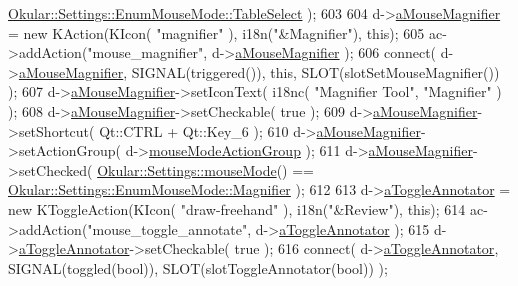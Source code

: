 \begin{DoxyCode}
      \hyperlink{classOkular_1_1Settings_1_1EnumMouseMode_ab2ae04e2d7d069f02195ccf32c52415ba5422065f9d7eff6cc08eef755e862af3}{Okular::Settings::EnumMouseMode::TableSelect} );
603 
604     d->\hyperlink{classPageViewPrivate_a48a8cc9cf9c4aa483c79c8f81fc62ea7}{aMouseMagnifier} = \textcolor{keyword}{new} KAction(KIcon( \textcolor{stringliteral}{"magnifier"} ), i18n(\textcolor{stringliteral}{"&Magnifier"}), \textcolor{keyword}{this});
605     ac->addAction(\textcolor{stringliteral}{"mouse\_magnifier"}, d->\hyperlink{classPageViewPrivate_a48a8cc9cf9c4aa483c79c8f81fc62ea7}{aMouseMagnifier} );
606     connect( d->\hyperlink{classPageViewPrivate_a48a8cc9cf9c4aa483c79c8f81fc62ea7}{aMouseMagnifier}, SIGNAL(triggered()), \textcolor{keyword}{this}, SLOT(slotSetMouseMagnifier()) );
607     d->\hyperlink{classPageViewPrivate_a48a8cc9cf9c4aa483c79c8f81fc62ea7}{aMouseMagnifier}->setIconText( i18nc( \textcolor{stringliteral}{"Magnifier Tool"}, \textcolor{stringliteral}{"Magnifier"} ) );
608     d->\hyperlink{classPageViewPrivate_a48a8cc9cf9c4aa483c79c8f81fc62ea7}{aMouseMagnifier}->setCheckable( \textcolor{keyword}{true} );
609     d->\hyperlink{classPageViewPrivate_a48a8cc9cf9c4aa483c79c8f81fc62ea7}{aMouseMagnifier}->setShortcut( Qt::CTRL + Qt::Key\_6 );
610     d->\hyperlink{classPageViewPrivate_a48a8cc9cf9c4aa483c79c8f81fc62ea7}{aMouseMagnifier}->setActionGroup( d->\hyperlink{classPageViewPrivate_ae7b75854286f78f9b871f99bebb1eb73}{mouseModeActionGroup} );
611     d->\hyperlink{classPageViewPrivate_a48a8cc9cf9c4aa483c79c8f81fc62ea7}{aMouseMagnifier}->setChecked( \hyperlink{classOkular_1_1Settings_af8e39e25e841b413d67af2cb4dfc0688}{Okular::Settings::mouseMode}()
       == \hyperlink{classOkular_1_1Settings_1_1EnumMouseMode_ab2ae04e2d7d069f02195ccf32c52415bab95111677f0c566414f48ece94ce0f45}{Okular::Settings::EnumMouseMode::Magnifier} );
612 
613     d->\hyperlink{classPageViewPrivate_a29f1ef25d86a534e1605ae5e662233b8}{aToggleAnnotator}  = \textcolor{keyword}{new} KToggleAction(KIcon( \textcolor{stringliteral}{"draw-freehand"} ), i18n(\textcolor{stringliteral}{"&Review"}), \textcolor{keyword}{
      this});
614     ac->addAction(\textcolor{stringliteral}{"mouse\_toggle\_annotate"}, d->\hyperlink{classPageViewPrivate_a29f1ef25d86a534e1605ae5e662233b8}{aToggleAnnotator} );
615     d->\hyperlink{classPageViewPrivate_a29f1ef25d86a534e1605ae5e662233b8}{aToggleAnnotator}->setCheckable( \textcolor{keyword}{true} );
616     connect( d->\hyperlink{classPageViewPrivate_a29f1ef25d86a534e1605ae5e662233b8}{aToggleAnnotator}, SIGNAL(toggled(\textcolor{keywordtype}{bool})), SLOT(slotToggleAnnotator(\textcolor{keywordtype}{bool})) );

\end{DoxyCode}
